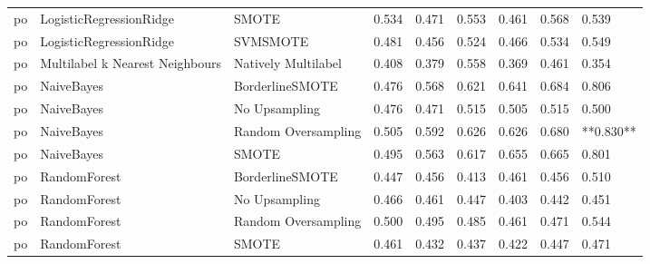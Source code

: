 \begin{tabular}{lllllllll}
      po &         LogisticRegressionRidge &                         SMOTE & 0.534 &                     0.471 &                 0.553 &                  0.461 &                                   0.568 &     0.539 \\
      po &         LogisticRegressionRidge &                      SVMSMOTE & 0.481 &                     0.456 &                 0.524 &                  0.466 &                                   0.534 &     0.549 \\
      po & Multilabel k Nearest Neighbours &           Natively Multilabel & 0.408 &                     0.379 &                 0.558 &                  0.369 &                                   0.461 &     0.354 \\
      po &                      NaiveBayes &               BorderlineSMOTE & 0.476 &                     0.568 &                 0.621 &                  0.641 &                                   0.684 &     0.806 \\
      po &                      NaiveBayes &                 No Upsampling & 0.476 &                     0.471 &                 0.515 &                  0.505 &                                   0.515 &     0.500 \\
      po &                      NaiveBayes &           Random Oversampling & 0.505 &                     0.592 &                 0.626 &                  0.626 &                                   0.680 & **0.830** \\
      po &                      NaiveBayes &                         SMOTE & 0.495 &                     0.563 &                 0.617 &                  0.655 &                                   0.665 &     0.801 \\
      po &                    RandomForest &               BorderlineSMOTE & 0.447 &                     0.456 &                 0.413 &                  0.461 &                                   0.456 &     0.510 \\
      po &                    RandomForest &                 No Upsampling & 0.466 &                     0.461 &                 0.447 &                  0.403 &                                   0.442 &     0.451 \\
      po &                    RandomForest &           Random Oversampling & 0.500 &                     0.495 &                 0.485 &                  0.461 &                                   0.471 &     0.544 \\
      po &                    RandomForest &                         SMOTE & 0.461 &                     0.432 &                 0.437 &                  0.422 &                                   0.447 &     0.471 \\

\end{tabular}
